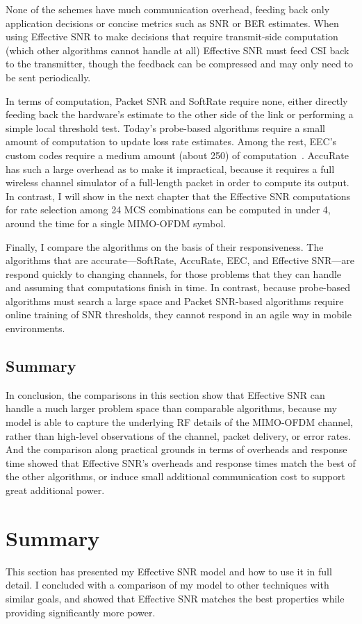 None of the schemes have much communication overhead, feeding back only application decisions or concise metrics such as SNR or BER estimates. When using Effective SNR to make decisions that require transmit-side computation (which other algorithms cannot handle at all) Effective SNR must feed CSI back to the transmitter, though the feedback can be compressed and may only need to be sent periodically.

In terms of computation, Packet SNR and SoftRate require none, either directly feeding back the hardware's estimate to the other side of the link or performing a simple local threshold test. Today's probe-based algorithms require a small amount of computation to update loss rate estimates. Among the rest, EEC's custom codes require a medium amount (about 250\us) of computation~\cite{Chen_EEC}. AccuRate has such a large overhead as to make it impractical, because it requires a full wireless channel simulator of a full-length packet in order to compute its output. In contrast, I will show in the next chapter that the Effective SNR computations for rate selection among 24 MCS combinations can be computed in under 4\us, around the time for a single MIMO-OFDM symbol.

Finally, I compare the algorithms on the basis of their responsiveness. The algorithms that are accurate---SoftRate, AccuRate, EEC, and Effective SNR---are respond quickly to changing channels, for those problems that they can handle and assuming that computations finish in time. In contrast, because probe-based algorithms must search a large space and Packet SNR-based algorithms require online training of SNR thresholds, they cannot respond in an agile way in mobile environments.

\subsection{Summary}
In conclusion, the comparisons in this section show that Effective SNR can handle a much larger problem space than comparable algorithms, because my model is able to capture the underlying RF details of the MIMO-OFDM channel, rather than high-level observations of the channel, packet delivery, or error rates. And the comparison along practical grounds in terms of overheads and response time showed that Effective SNR's overheads and response times match the best of the other algorithms, or induce small additional communication cost to support great additional power.

\section{Summary}
This section has presented my Effective SNR model and how to use it in full detail. I concluded with a comparison of my model to other techniques with similar goals, and showed that Effective SNR matches the best properties while providing significantly more power.

